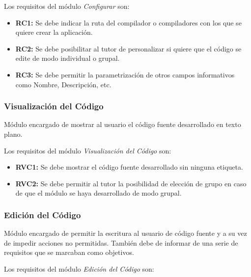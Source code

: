 Los requisitos del módulo \emph{Configurar} son:

\begin{itemize}
	\item \textbf{RC1:} Se debe indicar la ruta del compilador o compiladores con los que se quiere crear la aplicación.
	\item \textbf{RC2:} Se debe posibilitar al tutor de personalizar si quiere que el código se edite de modo individual o grupal.
	\item \textbf{RC3:} Se debe permitir la parametrización de otros campos informativos como Nombre, Descripción, etc.
\end{itemize}

\subsubsection{Visualización del Código}

Módulo encargado de mostrar al usuario el código fuente desarrollado en texto plano.

Los requisitos del módulo \emph{Visualización del Código} son:

\begin{itemize}
	\item \textbf{RVC1:} Se debe mostrar el código fuente desarrollado sin ninguna etiqueta.
	\item \textbf{RVC2:} Se debe permitir al tutor la posibilidad de elección de grupo en caso de que el módulo se haya desarrollado de modo grupal.
\end{itemize}
	
\subsubsection{Edición del Código}

Módulo encargado de permitir la escritura al usuario de código fuente y a su vez de impedir acciones no permitidas. También debe de informar de una serie de requisitos que se marcaban como objetivos.

Los requisitos del módulo \emph{Edición del Código} son:

